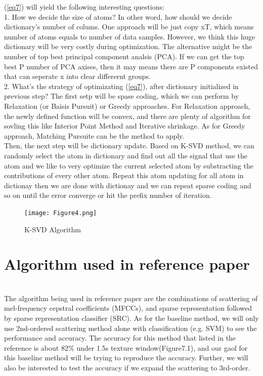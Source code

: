 \documentclass[final]{siamltexmm}
\begin{document}
(\ref{eq7}) will yield the following interesting questions: \\
1. How we decide the size of atoms? In other word, how should we decide dictionary’s number of colums. One approach will be just copy xT, which means number of atoms equals to number of data samples. However, we think this huge dictionary will be very costly during optimization. The alternative might be the number of top best principal component analsis (PCA). If we can get the top best P number of PCA axises, then it may means there are P components existed that can seperate x into clear differernt groups. \\
2. What’s the strategy of optimizating (\ref{eq7}), after dictionary initialized in previous step? The first setp will be spase coding, which we can perform by Relaxation (or Baisis Pursuit) or Greedy approaches. For Relaxation approach, the newly defined function will be convex, and there are plenty of algorithm for sovling this like Interior Point Method and Iterative shrinkage. As for Greedy approach, Matching Pursuite can be the method to apply. \\

Then, the next step will be dictionary update. Based on K-SVD method, we can randomly select the atom in dictionary and find out all the signal that use the atom and we like to very optimize the current selected atom by substracting the contributions of every other atom. Repeat this atom updating for all atom in dictionay then we are done with dictionay and we can repeat sparse coding and so on until the error converge or hit the prefix number of iteration.

\begin{figure}[ht]
\begin{center}
  \texttt{[image: Figure4.png]}
  \caption{K-SVD Algorithm}
\end{center}
\end{figure}

\section{Algorithm used in reference paper} \\
The algorithm being used in reference paper are the combinations of scattering of mel-frequency cepstral coefficients (MFCCs), and sparse representation followed by sparse representation classifier (SRC). As for the baseline method, we will only use 2nd-ordered scattering method alone with classification (e.g. SVM) to see the performance and accuracy. The accuracy for this method that listed in the reference is about 82\% under 1.5s texture window(Figure7.1), and our gaol for this baseline method will be trying to reproduce the accuracy. Further, we will also be interested to test the accuracy if we expand the scattering to 3rd-order.
\end{document}
